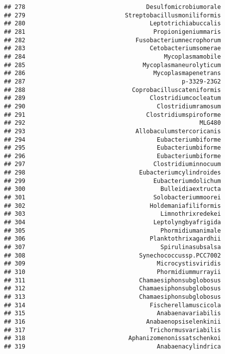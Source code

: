 \documentclass[
]{article}
\begin{document}
\begin{verbatim}
## 278                                  Desulfomicrobiumorale
## 279                            Streptobacillusmoniliformis
## 280                                   Leptotrichiabuccalis
## 281                                    Propionigeniummaris
## 282                               Fusobacteriumnecrophorum
## 283                                   Cetobacteriumsomerae
## 284                                       Mycoplasmamobile
## 285                                 Mycoplasmaneurolyticum
## 286                                    Mycoplasmapenetrans
## 287                                            p-3329-23G2
## 288                              Coprobacilluscateniformis
## 289                                   Clostridiumcocleatum
## 290                                     Clostridiumramosum
## 291                                  Clostridiumspiroforme
## 292                                                 MLG480
## 293                               Allobaculumstercoricanis
## 294                                     Eubacteriumbiforme
## 295                                     Eubacteriumbiforme
## 296                                     Eubacteriumbiforme
## 297                                    Clostridiuminnocuum
## 298                                Eubacteriumcylindroides
## 299                                    Eubacteriumdolichum
## 300                                      Bulleidiaextructa
## 301                                    Solobacteriummoorei
## 302                                   Holdemaniafiliformis
## 303                                      Limnothrixredekei
## 304                                    Leptolyngbyafrigida
## 305                                      Phormidiumanimale
## 306                                   Planktothrixagardhii
## 307                                      Spirulinasubsalsa
## 308                                Synechococcussp.PCC7002
## 309                                     Microcystisviridis
## 310                                     Phormidiummurrayii
## 311                                Chamaesiphonsubglobosus
## 312                                Chamaesiphonsubglobosus
## 313                                Chamaesiphonsubglobosus
## 314                                   Fischerellamuscicola
## 315                                     Anabaenavariabilis
## 316                                  Anabaenopsiselenkinii
## 317                                   Trichormusvariabilis
## 318                             Aphanizomenonissatschenkoi
## 319                                     Anabaenacylindrica

\end{verbatim}
\end{document}
